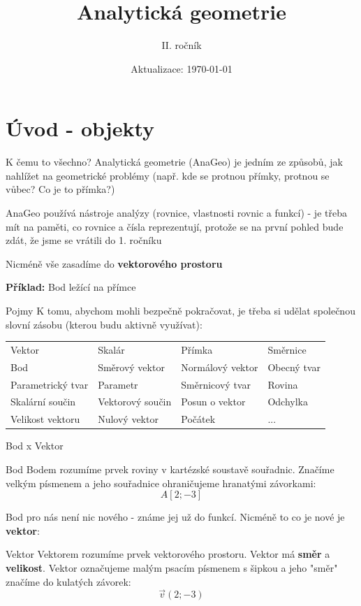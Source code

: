 \documentclass[aspectratio=169]{beamer} %
\title{Analytická geometrie}
\author{II. ročník}
\date{Aktualizace: \today}
\begin{document}
  \maketitle

  \section{Úvod - objekty}

  \begin{frame}{K čemu to všechno?}
    Analytická geometrie (AnaGeo) je jedním ze způsobů, jak nahlížet na
    geometrické problémy (např. kde se protnou přímky, protnou se vůbec? Co je
    to přímka?)
	
	\medskip
    AnaGeo používá nástroje analýzy (rovnice, vlastnosti rovnic a funkcí) - je třeba
    mít na paměti, co rovnice a čísla reprezentují, protože se na první pohled bude
    zdát, že jsme se vrátili do 1. ročníku 
	
	\medskip
    Nicméně vše zasadíme do \textbf{vektorového prostoru} 
	
	\medskip
    \textbf{Příklad:} Bod ležící na přímce
  \end{frame}

  \begin{frame}{Pojmy}
    K tomu, abychom mohli bezpečně pokračovat, je třeba si udělat společnou slovní
    zásobu (kterou budu aktivně využívat):
	
	\medskip
    \begin{tabular}{C{3cm} C{3cm} C{3cm} C{3cm}}
      Vektor            & Skalár           & Přímka           & Směrnice    \\
      Bod               & Směrový vektor   & Normálový vektor & Obecný tvar \\
      Parametrický tvar & Parametr         & Směrnicový tvar  & Rovina      \\
      Skalární součin   & Vektorový součin & Posun o vektor   & Odchylka    \\
      Velikost vektoru  & Nulový vektor    & Počátek          & ...         \\
    \end{tabular}
  \end{frame}

  \begin{frame}{Bod x Vektor}
    \begin{alertblock}{Bod}
      Bodem rozumíme prvek roviny v kartézské soustavě souřadnic. Značíme velkým
      písmenem a jeho souřadnice ohraničujeme hranatými závorkami:
      \[
        A[2;-3]
      \]
    \end{alertblock}
    Bod pro nás není nic nového - známe jej už do funkcí. Nicméně to co je nové
    je \textbf{vektor}:
    \begin{alertblock}{Vektor}
      Vektorem rozumíme prvek vektorového prostoru. Vektor má \textbf{směr} a \textbf{velikost}.
      Vektor označujeme malým psacím písmenem s šipkou a jeho "směr" značíme do kulatých
      závorek:
      \[
        \vec{v}(2;-3)
      \]
    \end{alertblock}
  \end{frame}
\end{document}
